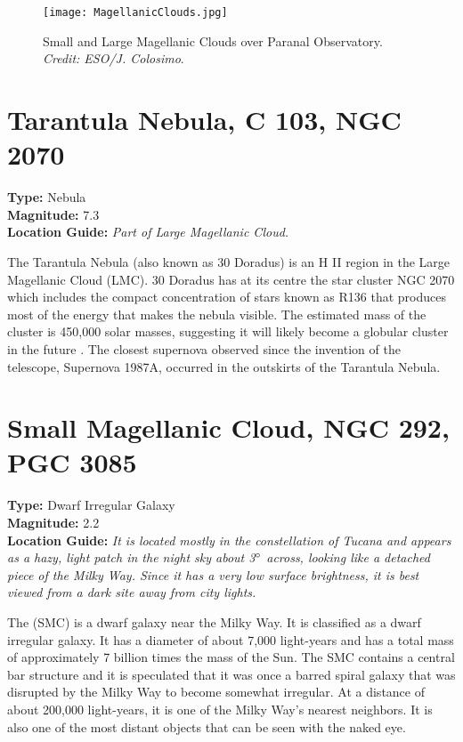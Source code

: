 \begin{figure}[ht]
\texttt{[image: MagellanicClouds.jpg]}
\caption{Small and Large Magellanic Clouds over Paranal Observatory. \emph{Credit: ESO/J. Colosimo}.}
\label{fig:MagellanicClouds}
\end{figure}

\section{Tarantula Nebula, C 103, NGC 2070}
\textbf{Type:} Nebula \\
\textbf{Magnitude:} 7.3 \\ 
\textbf{Location Guide:} \textit{Part of Large Magellanic Cloud.}

The Tarantula Nebula (also known as 30 Doradus) is an H II region in
the Large Magellanic Cloud (LMC). 30 Doradus has at its centre the
star cluster NGC 2070 which includes the compact concentration of
stars known as R136 that produces most of the energy that makes the
nebula visible. The estimated mass of the cluster is 450,000 solar
masses, suggesting it will likely become a globular cluster in the
future \cite{2009AJ....137.3437B}. The closest supernova observed
since the invention of the telescope, Supernova 1987A, occurred in the
outskirts of the Tarantula Nebula.

\section{Small Magellanic Cloud, NGC 292, PGC 3085}
\textbf{Type:} Dwarf Irregular Galaxy \\
\textbf{Magnitude:} 2.2 \\
\textbf{Location Guide:} \textit{It is located mostly in the
  constellation of Tucana and appears as a hazy, light patch in the
  night sky about 3$\degree$ across, looking like a detached piece of
  the Milky Way. Since it has a very low surface brightness, it is
  best viewed from a dark site away from city lights.}

The  (SMC) is a dwarf galaxy near
the Milky Way. It is classified as a dwarf irregular galaxy. It has a
diameter of about 7,000 light-years and has a total mass of
approximately 7 billion times the mass of the Sun. The SMC contains a
central bar structure and it is speculated that it was once a barred
spiral galaxy that was disrupted by the Milky Way to become somewhat
irregular. At a distance of about 200,000 light-years, it is one of
the Milky Way's nearest neighbors. It is also one of the most distant
objects that can be seen with the naked eye.

